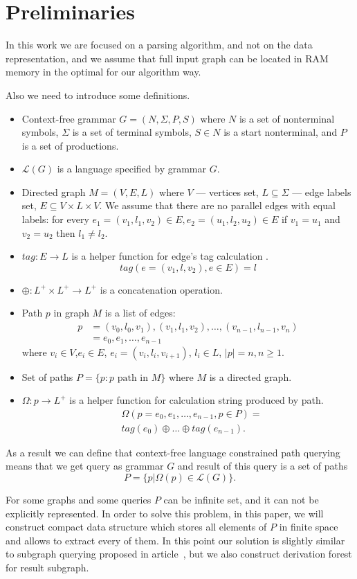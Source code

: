 \section{Preliminaries}

In this work we are focused on a parsing algorithm, and not on the data representation, and we assume that full input graph can be located in RAM memory in the optimal for our algorithm way.

Also we need to introduce some definitions.
\begin{itemize}
  \item Context-free grammar $G=(N, \Sigma, P, S)$ where $N$ is a set of nonterminal symbols, $\Sigma$ is a set of terminal symbols, $S \in N$ is a start nonterminal, and $P$ is a set of productions. 
  \item $\mathcal{L}(G)$ is a language specified by grammar $G$.
  \item Directed graph $M = (V,E,L)$ where $V$ --- vertices set, $L \subseteq \Sigma$ --- edge labels set, $E\subseteq V\times L\times V$. 
  We assume that there are no parallel edges with equal labels: for every $e_1=(v_1,l_1,v_2) \in E, e_2=(u_1,l_2,u_2) \in E$ if $v_1 = u_1$ and $v_2 = u_2$ then $l_1 \neq l_2$.
  \item $tag: E \rightarrow L$ is a helper function for edge's tag calculation . $$tag(e = (v_1,l,v_2), e \in E) = l$$
  \item $\oplus: L^+ \times L^+ \rightarrow L^+$ is a concatenation operation.
  \item Path $p$ in graph $M$ is a list of edges: 
  \begin{align*}
   p &= (v_0,l_0,v_1),(v_1,l_1,v_2),\dots,(v_{n-1},l_{n-1},v_n) \\
     &= e_0,e_1,\dots,e_{n-1}
  \end{align*}
  where $v_i \in V$,$e_i \in E$, $e_i=(v_i,l_i,v_{i+1})$, $l_i \in L$, $|p| = n, n \geq 1$. 
  \item Set of paths $P = \{p: p \text{ path in } M\}$ where $M$ is a directed graph.
  \item $\Omega: p \rightarrow L^+$ is a helper function for calculation string produced by path. 
  \begin{align*}
  & \Omega(p = e_{0},e_{1},\dots,e_{n-1}, p \in P) = \\
  & tag (e_{0}) \oplus \dots \oplus tag (e_{n-1}).
  \end{align*}
\end{itemize}

As a result we can define that context-free language constrained path querying means that we get query as grammar $G$ and result of this query is a set of paths $$P=\{p|\Omega(p) \in \mathcal{L}(G)\}.$$

For some graphs and some queries $P$ can be infinite set, and it can not be explicitly represented. 
In order to solve this problem, in this paper, we will construct compact data structure which stores all elements of $P$ in finite space and allows to extract every of them.
In this point our solution is slightly similar to subgraph querying proposed in article~\cite{GraphQueryWithEarley}, but we also construct derivation forest for result subgraph.
